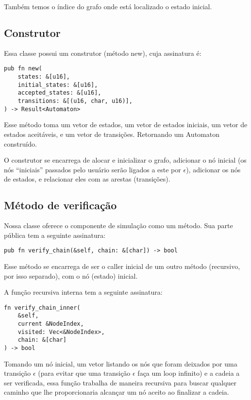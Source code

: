 \documentclass[12pt]{article}
\begin{document}
Também temos o índice do grafo onde está localizado o estado inicial.

\subsection{Construtor}
Essa classe possui um construtor (método new), cuja assinatura é:

\begin{verbatim}
pub fn new(
    states: &[u16],
    initial_states: &[u16],
    accepted_states: &[u16],
    transitions: &[(u16, char, u16)],
) -> Result<Automaton>
\end{verbatim}

Esse método toma um vetor de estados, um vetor de estados iniciais, um vetor de estados aceitáveis, e um vetor de transições. Retornando um Automaton construído.

O construtor se encarrega de alocar e inicializar o grafo, adicionar o nó inicial (os nós ``iniciais'' passados pelo usuário serão ligados a este por \(\epsilon\)), adicionar os nós de estados, e relacionar eles com as arestas (transições).

\subsection{Método de verificação}

Nossa classe oferece o componente de simulação como um método. Sua parte pública tem a seguinte assinatura:
\begin{verbatim}
pub fn verify_chain(&self, chain: &[char]) -> bool
\end{verbatim}

Esse método se encarrega de ser o caller inicial de um outro método (recursivo, por isso separado), com o nó (estado) inicial.

A função recursiva interna tem a seguinte assinatura:
\begin{verbatim}
fn verify_chain_inner(
    &self,
    current &NodeIndex,
    visited: Vec<&NodeIndex>,
    chain: &[char]
) -> bool
\end{verbatim}

Tomando um nó inicial, um vetor listando os nós que foram deixados por uma transição \(\epsilon\) (para evitar que uma transição \(\epsilon\) faça um loop infinito) e a cadeia a ser verificada, essa função trabalha de maneira recursiva para buscar qualquer caminho que lhe proporcionaria alcançar um nó aceito ao finalizar a cadeia.
\end{document}
